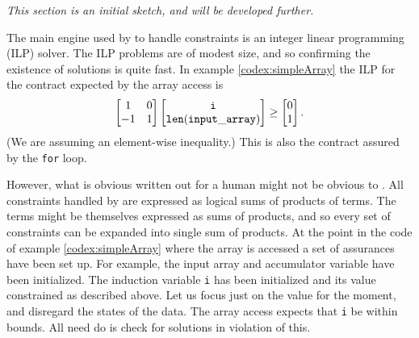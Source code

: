 \documentclass[10pt]{amsart}
\begin{document}
\emph{This section is an initial sketch, and will be developed further.}

The main engine used by \Utop to handle constraints is an integer
linear programming (ILP) solver.  The ILP problems are of modest size,
and so confirming the existence of solutions is quite fast.  In
example \ref{codex:simpleArray} the ILP for the contract expected by
the array access is
\begin{gather}
  \begin{bmatrix}
    1 & 0 \\ -1 & 1
  \end{bmatrix}
  \begin{bmatrix}
    \mathtt{i} \\ \mathtt{len(input\_array)}
  \end{bmatrix}
  \geq
  \begin{bmatrix}
    0 \\ 1
  \end{bmatrix}
  \text{.}
\end{gather}
(We are assuming an element-wise inequality.)  This is also the
contract assured by the \texttt{for} loop.

However, what is obvious written out for a human might not be obvious
to \Utop.  All constraints handled by \Utop are expressed as logical
sums of products of terms.  The terms might be themselves expressed as
sums of products, and so every set of constraints can be expanded into
single sum of products.  At the point in the code of example
\ref{codex:simpleArray} where the array is accessed a set of
assurances have been set up.  For example, the input array and
accumulator variable have been initialized.  The induction variable
\texttt{i} has been initialized and its value constrained as described
above.  Let us focus just on the value for the moment, and disregard
the states of the data.  The array access expects that \texttt{i} be
within bounds.  All \Utop need do is check for solutions in violation
of this.
\end{document}
